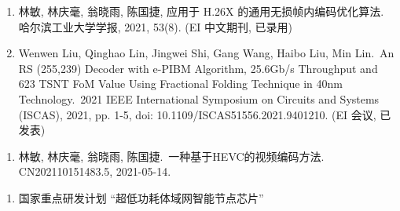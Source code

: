 \begin{publications}
    \begin{enumerate}
        \item 林敏, 林庆毫, 翁晓雨, 陈国捷,
              应用于 H.26X 的通用无损帧内编码优化算法.\,
              哈尔滨工业大学学报, 2021, 53(8). (EI 中文期刊, 已录用)

        \item Wenwen Liu, Qinghao Lin, Jingwei Shi, Gang Wang, Haibo Liu, Min Lin.\,
              An RS (255,239) Decoder with e-PIBM Algorithm, 25.6Gb/s Throughput and 623 TSNT FoM Value Using Fractional Folding Technique in 40nm Technology.\,
              2021 IEEE International Symposium on Circuits and Systems (ISCAS), 2021, pp. 1-5, doi: 10.1109/ISCAS51556.2021.9401210. (EI 会议, 已发表)
    \end{enumerate}

    \begin{enumerate}
        \item 林敏, 林庆毫, 翁晓雨, 陈国捷.\,
              一种基于HEVC的视频编码方法.\,
              CN202110151483.5, 2021-05-14.
    \end{enumerate}

    \begin{enumerate}
        \item 国家重点研发计划 “超低功耗体域网智能节点芯片”
    \end{enumerate}
\end{publications}